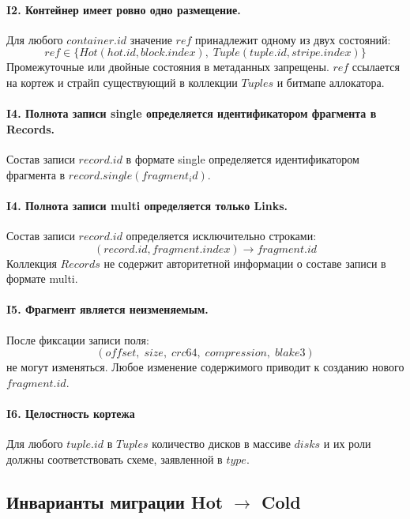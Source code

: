 \documentclass[a4paper,12pt]{article}
\begin{document}
    \paragraph{I2. Контейнер имеет ровно одно размещение.}
    Для любого $container.id$ значение $ref$ принадлежит одному из двух состояний:
    \[
        ref \in \{ Hot(hot.id, block.index),\; Tuple(tuple.id, stripe.index) \}
    \]
    Промежуточные или двойные состояния в метаданных запрещены. $ref$ ссылается на кортеж и страйп
    существующий в коллекции $Tuples$ и битмапе аллокатора.

    \paragraph{I4. Полнота записи single определяется идентификатором фрагмента в Records.}
    Состав записи $record.id$ в формате single определяется идентификатором фрагмента в $record.single(fragment_id)$.

    \paragraph{I4. Полнота записи multi определяется только Links.}
    Состав записи $record.id$ определяется исключительно строками:
    \[
        (record.id, fragment.index) \rightarrow fragment.id
    \]
    Коллекция $Records$ не содержит авторитетной информации о составе записи в формате multi.

    \paragraph{I5. Фрагмент является неизменяемым.}
    После фиксации записи поля:
    \[
        (offset,\; size,\; crc64,\; compression,\; blake3)
    \]
    не могут изменяться. Любое изменение содержимого приводит к созданию нового
    $fragment.id$.

    \paragraph{I6. Целостность кортежа}
    Для любого $tuple.id$ в $Tuples$ количество дисков в массиве $disks$ и их роли должны соответствовать схеме, заявленной в $type$.

    \subsection{Инварианты миграции Hot $\rightarrow$ Cold}
\end{document}
